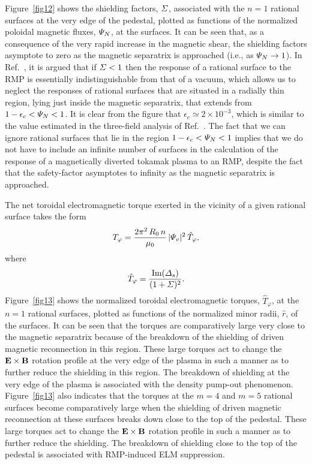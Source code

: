 \documentclass[12pt,prb,aps]{revtex4-1}
\begin{document}
Figure~\ref{fig12} shows the shielding factors, ${\mit\Sigma}$,  associated with  the $n=1$ rational surfaces at the very edge of the pedestal, plotted  as functions of the normalized poloidal magnetic
fluxes, ${\mit\Psi}_N$, at the surfaces. It can be seen that, as a consequence of the very rapid increase in the magnetic shear, the shielding factors asymptote to zero as the magnetic separatrix is approached (i.e., as ${\mit\Psi}_N\rightarrow 1$). In Ref.~, it is argued that if ${\mit\Sigma}< 1$ then the response of a rational surface to the RMP is essentially indistinguishable from that of a
vacuum, which allows us to neglect the responses of rational surfaces that are situated in a radially thin region, lying just inside the magnetic separatrix, that extends from 
$1-\epsilon_c <{\mit\Psi}_N < 1$. It is clear from the figure that $\epsilon_c\simeq 2\times 10^{-3}$, which is similar to the value estimated in the three-field analysis
of Ref.~. The fact that we can ignore rational surfaces that lie in the region $1-\epsilon_c <{\mit\Psi}_N < 1$ implies that we do not have to
include an infinite number of  surfaces in the calculation of the response of a magnetically diverted tokamak plasma to an RMP, despite the fact that the safety-factor
asymptotes to infinity as the magnetic separatrix is approached. 

The net toroidal electromagnetic torque exerted in the vicinity of a given rational surface takes the form\,\cite{rf1993} 
\begin{equation}
T_\varphi = \frac{2\pi^2\,R_0\,n}{\mu_0}\,|{\mit\Psi}_v|^2\,\hat{T}_\varphi,
\end{equation}
where
\begin{equation}
\hat{T}_\varphi = \frac{{\rm Im}({\mit\Delta}_s)}{(1+{\mit\Sigma})^2}.
\end{equation}
Figure~\ref{fig13} shows the normalized toroidal electromagnetic torques, $\hat{T}_\varphi$, at the $n=1$ rational surfaces, plotted as functions of the normalized minor radii, $\hat{r}$, of the surfaces. 
It can be seen that the torques are comparatively large very close to the magnetic separatrix because of the breakdown of the shielding of driven magnetic reconnection in this region. These large
torques act to change the ${\bf E}\times {\bf B}$ rotation profile at the very edge of the plasma in such a manner as to further reduce the shielding in this region.\cite{rf1993} The breakdown of shielding  at the very edge of the plasma is associated with the density pump-out phenomenon.\cite{hu,hu1,hu2} Figure~\ref{fig13} also indicates that the torques at the
$m=4$ and $m=5$ rational surfaces become comparatively large when the shielding of driven magnetic reconnection at these surfaces breaks down close to the top of
the pedestal. These large torques act to change the ${\bf E}\times {\bf B}$ rotation profile  in such a manner as to further reduce the shielding.\cite{rf1993} The breakdown of
shielding close to the top of the pedestal is associated with RMP-induced ELM suppression.\cite{hu,hu1,hu2,hu3,hu4}
\end{document}

